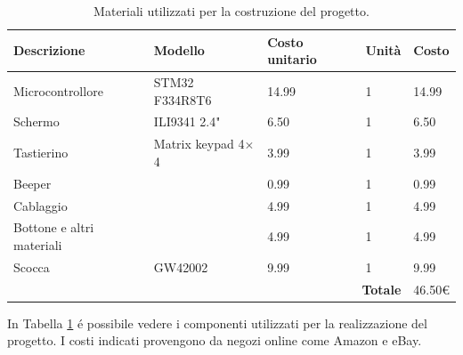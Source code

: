 \documentclass[a4paper]{article}
\begin{document}
\begin{table}[h!t] %
    \centering
    \begin{tabular}{|llll|l|}
        \hline
        \multicolumn{1}{|l|}{\textbf{Descrizione}}          & \multicolumn{1}{l|}{\textbf{Modello}}       & \multicolumn{1}{l|}{\textbf{Costo unitario}} & \textbf{Unità} & \textbf{Costo} \\ \hline
        \multicolumn{1}{|l|}{Microcontrollore}       & \multicolumn{1}{l|}{STM32 F334R8T6}         & \multicolumn{1}{l|}{14.99}                   & 1               & 14.99          \\ \hline
        \multicolumn{1}{|l|}{Schermo}                & \multicolumn{1}{l|}{ILI9341 2.4"}           & \multicolumn{1}{l|}{6.50}                    & 1               & 6.50           \\ \hline
        \multicolumn{1}{|l|}{Tastierino}          & \multicolumn{1}{l|}{Matrix keypad 4$\times$4} & \multicolumn{1}{l|}{3.99}                    & 1               & 3.99           \\ \hline
        \multicolumn{1}{|l|}{Beeper}                 & \multicolumn{1}{l|}{}                       & \multicolumn{1}{l|}{0.99}                    & 1               & 0.99           \\ \hline
        \multicolumn{1}{|l|}{Cablaggio} & \multicolumn{1}{l|}{}                       & \multicolumn{1}{l|}{4.99}                    & 1               & 4.99           \\ \hline
        \multicolumn{1}{|l|}{Bottone e altri materiali} & \multicolumn{1}{l|}{}       & \multicolumn{1}{l|}{4.99}                    & 1               & 4.99           \\ \hline
        \multicolumn{1}{|l|}{Scocca} & \multicolumn{1}{l|}{GW42002}                       & \multicolumn{1}{l|}{9.99}                    & 1               & 9.99           \\ \hline
        \multicolumn{4}{|r|}{\textbf{Totale}}                                                      & 46.50\euro    \\ \hline
    \end{tabular}
    \caption{
        Materiali utilizzati per la costruzione del progetto.
    }
    \label{tab:components}
\end{table}

In Tabella \ref{tab:components} é possibile vedere i componenti utilizzati per la realizzazione del progetto. I costi indicati provengono da negozi online come Amazon e eBay.
\end{document}
